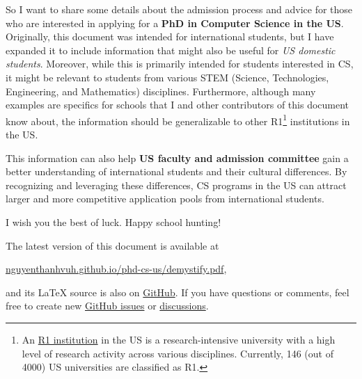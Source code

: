 \documentclass[oneside,11pt,dvipsnames]{book}
\begin{document}
So I want to share some details about the admission process and advice for those who are interested in applying for a \textbf{PhD in Computer Science in the US}.
Originally, this document was intended for international students, but I have expanded it to include information that might also be useful for \emph{US domestic students}.
Moreover, while this is primarily intended for students interested in CS, it might be relevant to students from various STEM (Science, Technologies, Engineering, and Mathematics) disciplines.
Furthermore, although many examples are specifics for schools that I and other contributors of this document know about, the information should be generalizable to other R1\footnote{An \href{https://en.wikipedia.org/wiki/List_of_research_universities_in_the_United_States}{R1 institution} in the US is a research-intensive university with a high level of research activity across various disciplines. Currently, 146 (out of 4000) US universities are classified as R1.} institutions in the US.

This information can also help \textbf{US faculty and admission committee} gain a better understanding of international students and their cultural differences.  By recognizing and leveraging these differences, CS programs in the US can attract larger and more competitive application pools from international students.

I wish you the best of luck. Happy school hunting!

\begin{mybox}
The latest version of this document is available at

\begin{center}
  \href{https://nguyenthanhvuh.github.io/phd-cs-us/demystify.pdf}{nguyenthanhvuh.github.io/phd-cs-us/demystify.pdf},
\end{center}

\noindent and its \LaTeX{} source is also on \href{https://github.com/nguyenthanhvuh/phd-cs-us}{GitHub}. If you have questions or comments, feel free to create new \href{https://github.com/nguyenthanhvuh/phd-cs-us/issues}{GitHub issues} or \href{https://github.com/nguyenthanhvuh/phd-cs-us/discussions}{discussions}.

\end{mybox}

\newpage
\tableofcontents
\end{document}
